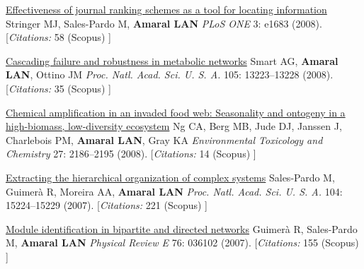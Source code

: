 \NumberedItem{\makebox[0.8cm][r]{[77]}}
\href{/people/amaral/effectiveness-journal-ranking-schemes-as-tool-for-locating-information}
{Effectiveness of journal ranking schemes as a tool for locating information}
\newline
Stringer MJ, Sales-Pardo M, {\textbf{Amaral LAN}}
\newline
\textit{PLoS ONE}
    3:
e1683 (2008).
    [{\em{Citations:}}  58 (Scopus) ]
\newline
\Gap
~
\Gap

\NumberedItem{\makebox[0.8cm][r]{[76]}}
\href{/people/amaral/cascading-failure-and-robustness-in-metabolic-networks}
{Cascading failure and robustness in metabolic networks}
\newline
Smart AG, {\textbf{Amaral LAN}}, Ottino JM
\newline
\textit{Proc. Natl. Acad. Sci. U. S. A.}
    105:
13223--13228 (2008).
    [{\em{Citations:}}  35 (Scopus) ]
\newline
\Gap
~
\Gap

\NumberedItem{\makebox[0.8cm][r]{[75]}}
\href{/people/amaral/chemical-amplification-in-an-invaded-food-web-seasonality-and-ontogeny-in-a-high-biomass-low-diversity-ecosystem}
{Chemical amplification in an invaded food web: Seasonality and ontogeny in a high-biomass, low-diversity ecosystem}
\newline
Ng CA, Berg MB, Jude DJ, Janssen J, Charlebois PM, {\textbf{Amaral LAN}}, Gray KA
\newline
\textit{Environmental Toxicology and Chemistry}
    27:
2186--2195 (2008).
    [{\em{Citations:}}  14 (Scopus) ]
\newline
\Gap
~
\Gap

\NumberedItem{\makebox[0.8cm][r]{[74]}}
\href{/people/amaral/extracting-the-hierarchical-organization-of-complex-systems}
{Extracting the hierarchical organization of complex systems}
\newline
Sales-Pardo M, Guimer\`a R, Moreira AA, {\textbf{Amaral LAN}}
\newline
\textit{Proc. Natl. Acad. Sci. U. S. A.}
    104:
15224--15229 (2007).
    [{\em{Citations:}}  221 (Scopus) ]
\newline
\Gap
~
\Gap

\NumberedItem{\makebox[0.8cm][r]{[73]}}
\href{/people/amaral/module-identification-in-bipartite-and-directed-networks}
{Module identification in bipartite and directed networks}
\newline
Guimer\`a R, Sales-Pardo M, {\textbf{Amaral LAN}}
\newline
\textit{Physical Review E}
    76:
036102 (2007).
    [{\em{Citations:}}  155 (Scopus) ]
\newline
\Gap
~
\Gap

